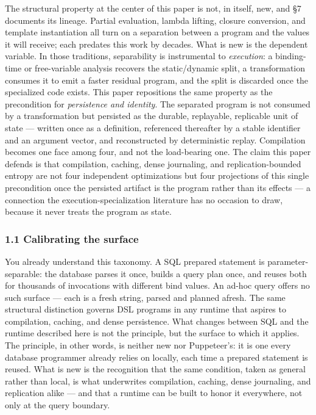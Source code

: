 \documentclass[
]{article}
\begin{document}
The structural property at the center of this paper is not, in itself,
new, and §7 documents its lineage. Partial evaluation, lambda lifting,
closure conversion, and template instantiation all turn on a separation
between a program and the values it will receive; each predates this
work by decades. What is new is the dependent variable. In those
traditions, separability is instrumental to \emph{execution}: a
binding-time or free-variable analysis recovers the static/dynamic
split, a transformation consumes it to emit a faster residual program,
and the split is discarded once the specialized code exists. This paper
repositions the same property as the precondition for \emph{persistence
and identity}. The separated program is not consumed by a transformation
but persisted as the durable, replayable, replicable unit of state ---
written once as a definition, referenced thereafter by a stable
identifier and an argument vector, and reconstructed by deterministic
replay. Compilation becomes one face among four, and not the
load-bearing one. The claim this paper defends is that compilation,
caching, dense journaling, and replication-bounded entropy are not four
independent optimizations but four projections of this single
precondition once the persisted artifact is the program rather than its
effects --- a connection the execution-specialization literature has no
occasion to draw, because it never treats the program as state.

\subsubsection{1.1 Calibrating the
surface}\label{calibrating-the-surface}

You already understand this taxonomy. A SQL prepared statement is
parameter-separable: the database parses it once, builds a query plan
once, and reuses both for thousands of invocations with different bind
values. An ad-hoc query offers no such surface --- each is a fresh
string, parsed and planned afresh. The same structural distinction
governs DSL programs in any runtime that aspires to compilation,
caching, and dense persistence. What changes between SQL and the runtime
described here is not the principle, but the surface to which it
applies. The principle, in other words, is neither new nor Puppeteer's:
it is one every database programmer already relies on locally, each time
a prepared statement is reused. What is new is the recognition that the
same condition, taken as general rather than local, is what underwrites
compilation, caching, dense journaling, and replication alike --- and
that a runtime can be built to honor it everywhere, not only at the
query boundary.
\end{document}
